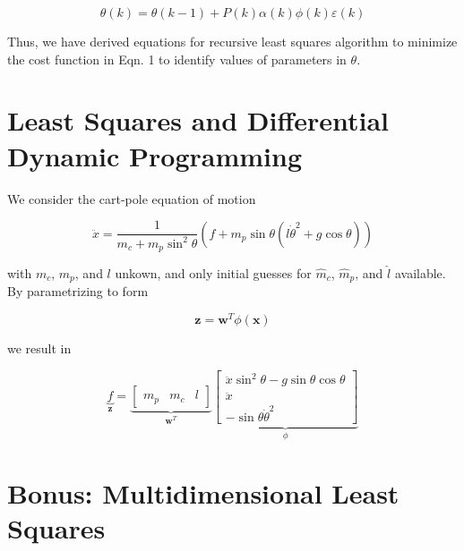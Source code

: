 \documentclass{article}
\begin{document}
\begin{equation}
\theta(k) = \theta(k-1) + P(k) \alpha(k) \phi(k) \varepsilon(k)
\end{equation}

Thus, we have derived equations for recursive least squares algorithm to minimize the cost function in Eqn. 1 to identify values of parameters in $\theta$.

\section{Least Squares and Differential Dynamic Programming}

We consider the cart-pole equation of motion

\begin{equation}
\ddot{x} = \frac{1}{m_c + m_p \sin^2 \theta} (f + m_p \sin \theta (l \dot{\theta}^2 + g \cos \theta))
\end{equation}

with $m_c$, $m_p$, and $l$ unkown, and only initial guesses for $\hat{m}_c$, $\hat{m}_p$, and $\hat{l}$ available. By parametrizing to form

\begin{equation}
\mathbf{z} = \mathbf{w}^T \phi(\mathbf{x})
\end{equation}

we result in

\begin{equation}
\underbrace{f}_{\mathbf{z}} = 
\underbrace{
\begin{bmatrix}
m_p & m_c & l
\end{bmatrix}}_{\mathbf{w}^T}
\underbrace{
\begin{bmatrix}
\ddot{x} \sin^2 \theta - g \sin \theta \cos \theta \\
\ddot{x} \\
- \sin \theta \dot{\theta}^2
\end{bmatrix}}_{\phi}
\end{equation}

\section{Bonus: Multidimensional Least Squares}
\end{document}
